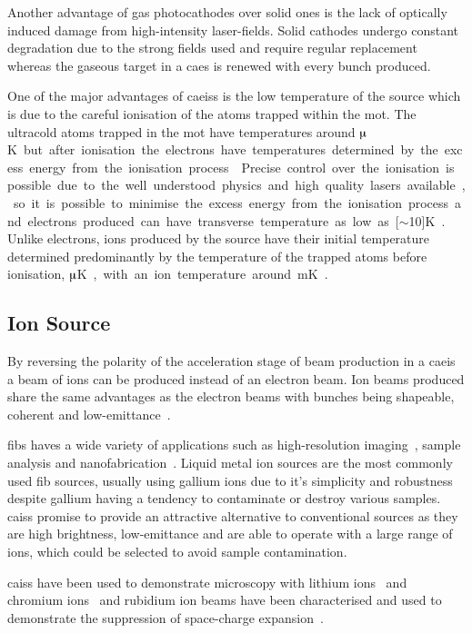 Another advantage of gas photocathodes over solid ones is the lack of optically induced damage from high-intensity laser-fields.
Solid cathodes undergo constant degradation due to the strong fields used and require regular replacement~\cite{dowell_results_1995} whereas the gaseous target in a \gls{caes} is renewed with every bunch produced.

One of the major advantages of \glspl{caeis} is the low temperature of the source which is due to the careful ionisation of the atoms trapped within the \gls{mot}.
The ultracold atoms trapped in the \gls{mot} have temperatures around \unit[100]{$\muup$K} but after ionisation the electrons have temperatures determined by the excess energy from the ionisation process~\cite{engelen_high-coherence_2013,engelen_analytical_2014,sparkes_high-coherence_2014,speirs_identification_2017}.
Precise control over the ionisation is possible due to the well understood physics and high quality lasers available, so it is possible to minimise the excess energy from the ionisation process and electrons produced can have transverse temperature as low as \unit[$\sim$10]{K}~\cite{saliba_spatial_2012}.
Unlike electrons, ions produced by the source have their initial temperature determined predominantly by the temperature of the trapped atoms before ionisation, \unit[100]{$\muup$K}, with an ion temperature around \unit[1]{mK}~\cite{debernardi_measurement_2011,murphy_detailed_2014}.

\subsection{Ion Source}

By reversing the polarity of the acceleration stage of beam production in a \gls{caeis} a beam of ions can be produced instead of an electron beam.
Ion beams produced share the same advantages as the electron beams with bunches being shapeable, coherent and low-emittance~\cite{knuffman_cold_2013}.

\Glspl{fib} haves a wide variety of applications such as high-resolution imaging~\cite{scipioni_helium_2008}, sample analysis and nanofabrication~\cite{khizroev_focused-ion-beam-based_2004}.
Liquid metal ion sources are the most commonly used \gls{fib} sources, usually using gallium ions due to it's simplicity and robustness despite gallium having a tendency to contaminate or destroy various samples.
\Glspl{cais} promise to provide an attractive alternative to conventional sources as they are high brightness, low-emittance and are able to operate with a large range of ions, which could be selected to avoid sample contamination.

\Glspl{cais} have been used to demonstrate microscopy with lithium ions~\cite{knuffman_nanoscale_2011} and chromium ions~\cite{steele_focused_2010} and rubidium ion beams have been characterised and used to demonstrate the suppression of space-charge expansion~\cite{murphy_detailed_2014,thompson_suppression_2016}.

